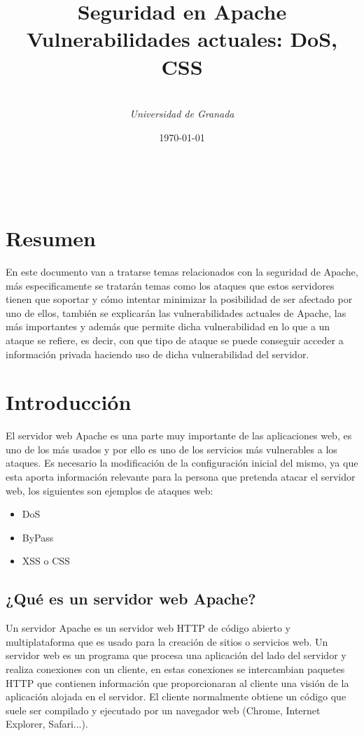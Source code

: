 \documentclass[a4paper, 10pt]{article} %
\title{\textbf{Seguridad en Apache}\\ %
\vspace{20 pt}
Vulnerabilidades actuales: DoS, CSS} %
\author{\textsc{} %
\\{\textit{Universidad de Granada}}} %
\date{\today} %
\makeatletter
\renewcommand{\maketitle}{ %
\begin{center} %
{\Huge\@title} %
\end{center}

\vspace{20pt} %

\begin{flushright} %
{\large\@author} %
\\\@date %

\vspace{40pt} %
\end{flushright}
\renewcommand{\baselinestretch}{0.5}

}
\makeatother
\begin{document}
\maketitle
\setcounter{page}{1}
\section{Resumen}
En este documento van a tratarse temas relacionados con la seguridad de Apache, más especificamente se tratarán temas como los ataques que estos servidores tienen que soportar y cómo intentar minimizar la posibilidad de ser afectado por uno de ellos, también se explicarán las vulnerabilidades actuales de Apache, las más importantes y además que permite dicha vulnerabilidad en lo que a un ataque se refiere, es decir, con que tipo de ataque se puede conseguir acceder a información privada haciendo uso de dicha vulnerabilidad del servidor.
\section{Introducción}
El servidor web Apache es una parte muy importante de las aplicaciones web, es uno de los más usados y por ello es uno de los servicios más vulnerables a los ataques. Es necesario la modificación de la configuración inicial del mismo, ya que esta aporta información relevante para la persona que pretenda atacar el servidor web, los siguientes son ejemplos de ataques web:
\begin{itemize}
	\item DoS
	\item ByPass
	\item XSS o CSS
\end{itemize}
\subsection{¿Qué es un servidor web Apache?}
\cite{1} Un servidor Apache es un servidor web HTTP de código abierto y multiplataforma que es usado para la creación de sitios o servicios web. \cite{2} Un servidor web es un programa que procesa una aplicación del lado del servidor y realiza conexiones con un cliente, en estas conexiones se intercambian paquetes HTTP que contienen información que proporcionaran al cliente una visión de la aplicación alojada en el servidor. El cliente normalmente obtiene un código que suele ser compilado y ejecutado por un navegador web (Chrome, Internet Explorer, Safari...). 
\end{document}
